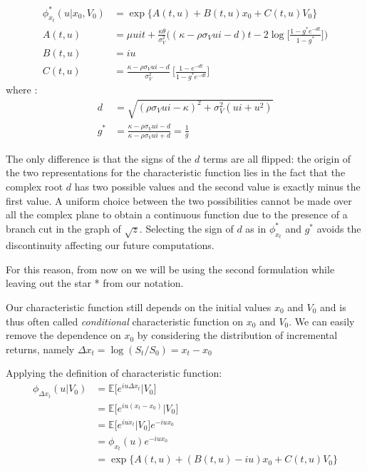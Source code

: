 \begin{equation}
\begin{split}
\label{eq:heston_chf_trap}
\phi_{x_t}^*(u| x_0, V_0) &= \exp\{A(t,u) + B(t,u) x_0 + C(t,u) V_0\}\\
A(t,u) &= \mu u i t +  \frac{\kappa\theta}{\sigma_V^2} \bigg( (\kappa - \rho\sigma_V u i - d)t - 2 \log\Big[  \frac{1-g^*e^{-dt}}{1-g^*} \Big] \bigg)\\
B(t,u) &= i u \\
C(t,u)&= \frac{\kappa - \rho\sigma_V u i - d}{\sigma_V^2} \:\Big[\frac{1-e^{-dt}}{1-g^*e^{-dt}}\Big]
\end{split}
\end{equation} 
where :
\begin{equation*}
\begin{split}
d&=\sqrt{(\rho \sigma_V u i - \kappa)^2 + \sigma_V^2(u i + u^2)}\\
g^*&= \frac{\kappa - \rho\sigma_V u i - d}{\kappa - \rho\sigma_V u i + d} = \frac{1}{g}
\end{split}
\end{equation*} 

The only difference is that the signs of the $d$ terms are all flipped: the origin of the two representations for the characteristic function lies in the fact that the complex root $d$ has two possible values and the second value is exactly minus the first value.
A uniform choice between the two possibilities cannot be made over all the complex plane to obtain a continuous function due to the presence of a branch cut in the graph of $\sqrt{z}$. Selecting the sign of $d$ as in $\phi_{x_t}^*$ and $g^*$ avoids the discontinuity affecting our future computations.

For this reason, from now on we will be using the second formulation while leaving out the star * from our notation.

\bigskip


Our characteristic function still depends on the initial values $x_0$ and  $V_0$ and is thus often called \textit{conditional} characteristic function on $x_0$ and $V_0$.
We can easily remove the dependence on $x_0$ by considering the distribution of incremental returns, namely $\Delta x_t = \log (S_t / S_0) = x_t - x_0$

Applying the definition of characteristic function:
\begin{equation*}
	\begin{split}
	\phi_{\Delta x_t}(u|V_0) &= \mathbb{E}\big[e^{i u \Delta x_t} |V_0\big] \\
	&=  \mathbb{E}\big[e^{i u ( x_t - x_0)}|V_0\big]\\
	&= \mathbb{E}\big[e^{i u x_t}|V_0\big] e^{-i u x_0}\\
	&= \phi_{x_t}(u) e^{-i u x_0}\\
	&= \exp\{A(t,u) + (B(t,u) - iu) x_0 + C(t,u) V_0\}
	\end{split}
\end{equation*}

